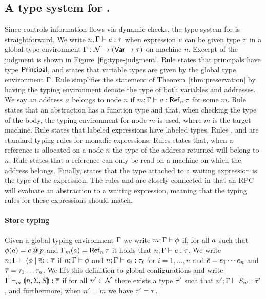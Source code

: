 \subsection{A type system for \lang.}
Since \lang{} controls information-flows via dynamic checks, the type system for \lang{} is straightforward. We write $\hastype{n; \tenv}{\expr}{\type}$ when expression $e$ can be given type $\tau$ in a global type environment $\Gamma: \mathcal{N} \to (\mathsf{Var} \to \tau)$ on machine $n$. Excerpt of the judgment is shown in Figure~\ref{fig:type-judgment}. Rule  states that principals have type $\mathsf{Principal}$, and  states that variable types are given by the global type environment $\Gamma$. Rule  simplifies the statement of Theorem~\ref{thm:preservation} by having the typing environment denote the type of both variables and addresses. We say an address $a$ belongs to node $n$ if $\hastype{m; \tenv}{\addr}{\reftype[n]{\type}}$ for some $m$. Rule  states that an abstraction has a function type and that, when checking the type of the body, the typing environment for node $m$ is used, where $m$ is the target machine. Rule  states that labeled expressions have labeled types. Rules ,  and  are standard typing rules for monadic expressions. Rules  states that, when a reference is allocated on a node $n$ the type of the address returned will belong to $n$. Rule  states that a reference can only be read on a machine on which the address belongs. Finally,  states that the type attached to a waiting expression is the type of the expression. The rules  and  are closely connected in that an RPC will evaluate an abstraction to a waiting expression, meaning that the typing rules for these expressions should match.

\paragraph{Store typing}
Given a global typing environment $\Gamma$ we write $m; \Gamma \vdash \phi$ if, for all $a$ such that $\phi(a) = e \mathbin{@} p$ and $\tenv_m(\addr) = \reftype[n]{\type}$ it holds that $\hastype{n; \tenv}{\expr}{\type}$. We write $\hastype{n; \tenv}{\config{\store}{\overline{\expr}}}{\overline{\type}}$ if $n; \Gamma \vdash \phi$ and $\hastype{n; \tenv}{\expr_i}{\type_i}$ for $i = 1, \dots, n$ and $\overline{e} = e_1 \cdots e_n$ and $\overline{\tau} = \tau_1 \dots \tau_n$. We lift this definition to global configurations and write $\hastype[m]{\tenv}{\gconfig{n}{\env}{S}}{\overline{\type}}$ if for all $n' \in \mathcal{N}$ there exists a type $\overline{\tau}'$ such that $\hastype{n'; \tenv}{S_{n'}}{\overline{\type}'}$, and furthermore, when $n' = m$ we have $\overline{\tau}' = \overline{\tau}$.

